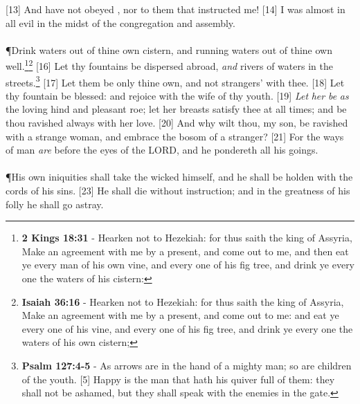 [13] \textcolor[cmyk]{0.99998,1,0,0}{And have not obeyed , nor  to them that instructed me!}
[14] \textcolor[cmyk]{0.99998,1,0,0}{I was almost in all evil in the midst of the congregation and assembly.}\\
\\
\P \textcolor[cmyk]{0.99998,1,0,0}{Drink waters out of thine own cistern, and running waters out of thine own well.}\footnote{\textbf{2 Kings 18:31} - Hearken not to Hezekiah: for thus saith the king of Assyria, Make an agreement with me by a present, and come out to me, and then eat ye every man of his own vine, and every one of his fig tree, and drink ye every one the waters of his cistern:}\footnote{\textbf{Isaiah 36:16} - Hearken not to Hezekiah: for thus saith the king of Assyria, Make an agreement with me by a present, and come out to me: and eat ye every one of his vine, and every one of his fig tree, and drink ye every one the waters of his own cistern;}
[16] \textcolor[cmyk]{0.99998,1,0,0}{Let thy fountains be dispersed abroad, \emph{and} rivers of waters in the streets.}\footnote{\textbf{Psalm 127:4-5} - As arrows are in the hand of a mighty man; so are children of the youth. [5] Happy is the man that hath his quiver full of them: they shall not be ashamed, but they shall speak with the enemies in the gate.}
[17] \textcolor[cmyk]{0.99998,1,0,0}{Let them be only thine own, and not strangers' with thee.}
[18] \textcolor[cmyk]{0.99998,1,0,0}{Let thy fountain be blessed: and rejoice with the wife of thy youth.}
[19] \textcolor[cmyk]{0.99998,1,0,0}{\emph{Let} \emph{her} \emph{be} \emph{as} the loving hind and pleasant roe; let her breasts satisfy thee at all times; and be thou ravished always with her love.}
[20] \textcolor[cmyk]{0.99998,1,0,0}{And why wilt thou, my son, be ravished with a strange woman, and embrace the bosom of a stranger?}
[21] \textcolor[cmyk]{0.99998,1,0,0}{For the ways of man \emph{are} before the eyes of the LORD, and he pondereth all his goings.}\\
\\
\P \textcolor[cmyk]{0.99998,1,0,0}{His own iniquities shall take the wicked himself, and he shall be holden with the cords of his sins.}
[23] \textcolor[cmyk]{0.99998,1,0,0}{He shall die without instruction; and in the greatness of his folly he shall go astray.}




